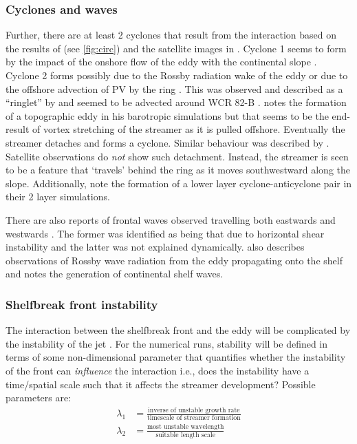 \subsubsection*{Cyclones and waves}
  Further, there are at least 2 cyclones that result from the interaction based on the results of \cite{Wei2009,Frolov2004,Oey2004} (see \cref{fig:circ}) and the satellite images in \cite{Kennelly1985}. Cyclone 1 seems to form by the impact of the onshore flow of the eddy with the continental slope \citep{Oey2004}. Cyclone 2 forms possibly due to the Rossby radiation wake of the eddy \citep{Ramp1986,McWilliams1979} or due to the offshore advection of PV by the ring \citep{Frolov2004,Zhang2009}. This was observed and described as a “ringlet” by \citep{Kennelly1985} and seemed to be advected around WCR 82-B \citep{Evans1985,Ramp1986}. \cite{Wang1992} notes the formation of a topographic eddy in his barotropic simulations but that seems to be the end-result of vortex stretching of the streamer as it is pulled offshore. Eventually the streamer detaches and forms a cyclone. Similar behaviour was described by \cite{Zhang2009}. Satellite observations do \emph{not} show such detachment. Instead, the streamer is seen to be a feature that ‘travels’ behind the ring as it moves southwestward along the slope. Additionally, \cite{Frolov2004} note the formation of a lower layer cyclone-anticyclone pair in their 2 layer simulations. 
  
  There are also reports of frontal waves observed travelling both eastwards \citep{Ramp1983} and westwards \citep{Ryan2001}. The former was identified as being that due to horizontal shear instability and the latter was not explained dynamically. \cite{Ramp1989} also describes observations of Rossby wave radiation from the eddy propagating onto the shelf and \cite{Wang1992} notes the generation of continental shelf waves. 

\subsubsection*{Shelfbreak front instability}
The interaction between the shelfbreak front and the eddy will be complicated by the instability of the jet \citep{Lozier2002}. For the numerical runs, stability will be defined in terms of some non-dimensional parameter that quantifies whether the instability of the front can \emph{influence} the interaction i.e., does the instability have a time/spatial scale such that it affects the streamer development? Possible parameters are: 
\begin{align}
	\lambda_1 &= \frac{\text{inverse of unstable growth rate}}{\text{timescale of streamer formation}} \\
	\lambda_2 &= \frac{\text{most unstable wavelength}}{\text{suitable length scale}}
\end{align}

